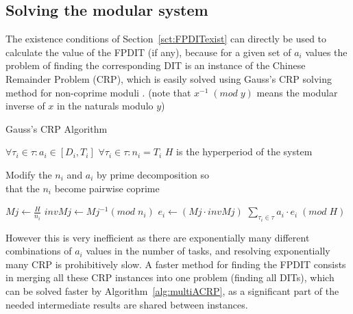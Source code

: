 \documentclass[conference]{IEEEtran}
\begin{document}
	\subsection{Solving the modular system}
		The existence conditions of	Section~\ref{sct:FPDITexist} can directly be used to calculate the value of
		the FPDIT (if any), because for a given set of $a_i$ values the problem of
		finding the corresponding DIT is an instance of the Chinese Remainder Problem
		(CRP), which is easily solved using Gauss's CRP solving method for non-coprime
		moduli \cite{gauss1965disquisitiones,knuth1969art}. (note that $x^{-1} \; (mod
		\; y)$ means the modular inverse of $x$ in the naturals modulo $y$)
		\begin{algorithm}
			\caption{Gauss's CRP Algorithm}
			\label{alg:algoCRP}
			\begin{algorithmic}[1]
				\REQUIRE $\forall \tau_i \in \tau : a_i \in [D_i,T_i]$
				\REQUIRE $\forall \tau_i \in \tau : n_i = T_i$
				\REQUIRE $H$ is the hyperperiod of the system

				\STATE Modify the $n_i$ and $a_i$ by prime decomposition so \\ that the
				$n_i$ become pairwise coprime

					\STATE $Mj \leftarrow \frac{H}{n_i}$
					\STATE $invMj \leftarrow Mj^{-1} (mod \; n_i)$
					\STATE $e_i \leftarrow (Mj \cdot invMj)$
				\ENDFOR
				\RETURN $\sum\limits_{\tau_i \in \tau}{a_i \cdot e_i} \; (mod \; H)$
			\end{algorithmic}
		\end{algorithm}


		However this is very inefficient as there are exponentially many different
		combinations of $a_i$ values in the number of tasks, and resolving
		exponentially many CRP is prohibitively slow. A faster method for finding
		the FPDIT consists in merging all these CRP instances into one problem
		(finding all DITs), which can be solved faster by
		Algorithm~\ref{alg:multiACRP}, as a significant part of the needed
		intermediate results are shared between instances.

\end{document}
